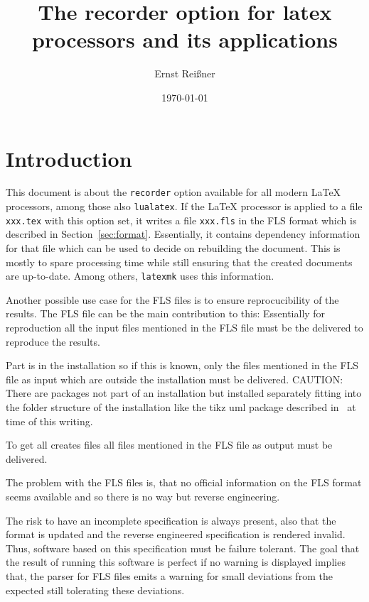 \documentclass[a4paper, english]{article}%
\title{The recorder option for latex processors and its applications}
\author{Ernst Reißner}
\date{\today}
\begin{document}
\maketitle
\tableofcontents

\section{Introduction}\label{sec:intro}

This document is about the \texttt{recorder} option available for all modern \LaTeX{} processors, 
among those also \texttt{lualatex}. 
If the \LaTeX{} processor is applied to a file \texttt{xxx.tex} with this option set, 
it writes a file \texttt{xxx.fls} in the FLS format 
which is described in Section~\ref{sec:format}. 
Essentially, it contains dependency information for that file 
which can be used to decide on rebuilding the document. 
This is mostly to spare processing time 
while still ensuring that the created documents are up-to-date. 
Among others, \texttt{latexmk} uses this information. 

Another possible use case for the FLS files is to ensure reprocucibility of the results. 
The FLS file can be the main contribution to this: 
Essentially for reproduction all the input files mentioned in the FLS file 
must be the delivered to reproduce the results. 

Part is in the installation so if this is known, 
only the files mentioned in the FLS file as input which are outside the installation must be delivered. 
CAUTION\@: There are packages not part of an installation 
but installed separately fitting into the folder structure of the installation 
like the tikz uml package described in~\cite{tikzumlP} at time of this writing. 

To get all creates files all files mentioned in the FLS file as output must be delivered. 
\medskip


The problem with the FLS files is, 
that no official information on the FLS format seems available 
and so there is no way but reverse engineering. 

The risk to have an incomplete specification is always present, 
also that the format is updated and the reverse engineered specification is rendered invalid. 
Thus, software based on this specification must be failure tolerant. 
The goal that the result of running this software is perfect if no warning is displayed 
implies that, the parser for FLS files emits a warning for small deviations from the expected 
still tolerating these deviations. 
\end{document}
